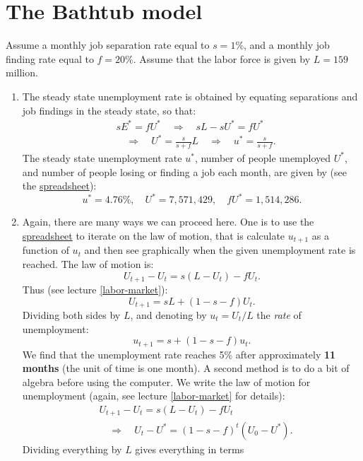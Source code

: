 \documentclass[]{book}
\begin{document}
\section{The Bathtub model}\label{the-bathtub-model-1}

Assume a monthly job separation rate equal to \(s=1\)\%, and a monthly
job finding rate equal to \(f=20\)\%. Assume that the labor force is
given by \(L=159\) million.

\begin{enumerate}
\def\labelenumi{\arabic{enumi}.}
\item
  The steady state unemployment rate is obtained by equating separations
  and job findings in the steady state, so that: \[
  \begin{aligned}
  &s E^{*} = f U^{*} \quad \Rightarrow \quad sL - s U^{*} = fU^{*}\\
  &\quad \Rightarrow \quad U^{*}=\frac{s}{s+f}L \quad \Rightarrow \quad u^{*}=\frac{s}{s+f}.
  \end{aligned}
  \] The steady state unemployment rate \(u^{*}\), number of people
  unemployed \(U^{*}\), and number of people losing or finding a job
  each month, are given by (see the
  \href{https://docs.google.com/spreadsheets/d/1h9JJD8K2_IE166gdj78waf0zu4YDY9Rp3r5oiJR_06s/edit?usp=sharing}{spreadsheet}):
  \[u^{*}=4.76\%, \quad U^{*}=7,571,429, \quad f U^{*} = 1,514,286.\]
\item
  Again, there are many ways we can proceed here. One is to use the
  \href{https://docs.google.com/spreadsheets/d/1h9JJD8K2_IE166gdj78waf0zu4YDY9Rp3r5oiJR_06s/edit?usp=sharing}{spreadsheet}
  to iterate on the law of motion, that is calculate \(u_{t+1}\) as a
  function of \(u_t\) and then see graphically when the given
  unemployment rate is reached. The law of motion is:
  \[U_{t+1}-U_t = s(L-U_t) -f U_t.\] Thus (see lecture
  \ref{labor-market}): \[U_{t+1}=sL + \left(1-s-f\right)U_t.\] Dividing
  both sides by \(L\), and denoting by \(u_{t}=U_t/L\) the \emph{rate}
  of unemployment: \[u_{t+1}=s+\left(1-s-f\right)u_t.\] We find that the
  unemployment rate reaches 5\% after approximately \textbf{11 months}
  (the unit of time is one month). A second method is to do a bit of
  algebra before using the computer. We write the law of motion for
  unemployment (again, see lecture \ref{labor-market} for details):
  \[\begin{aligned}
  &U_{t+1}-U_t = s(L-U_t) -f U_t \\
  & \quad \Rightarrow \quad U_{t}-U^{*}=(1-s-f)^t\left(U_0-U^{*}\right).
  \end{aligned}\] Dividing everything by \(L\) gives everything in terms

\end{enumerate}
\end{document}
